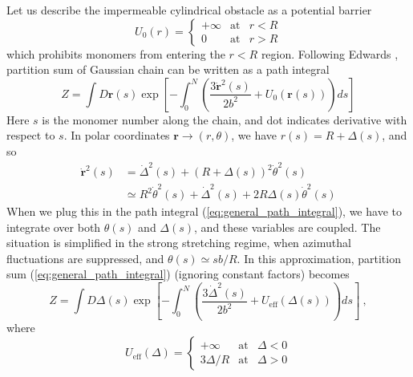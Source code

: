 \documentclass[aps,pre,floatfix,twocolumn,nofootinbib]{revtex4-2}
\begin{document}
Let us describe the impermeable cylindrical obstacle as a potential barrier
%
\begin{equation} U_0(r) = \left\{ \begin{array}{lcr} + \infty & \text{at} & r<R \\ 0 & \text{at} & r > R \end{array} \right. \end{equation}
%
which prohibits monomers from entering the $r<R$ region.  Following Edwards \cite{DoiEdwards}, partition sum of Gaussian chain can be written as a path integral
%
\begin{equation} Z = \int D \mathbf{r}(s) \exp \left[- \int_{0}^{N} \left( \frac{3 \dot{\mathbf{r}}^2(s)}{2 b^2} + U_0(\mathbf{r}(s)) \right) ds \right] \label{eq:general_path_integral} \end{equation}
%
Here $s$ is the monomer number along the chain, and dot indicates derivative with respect to $s$.   In polar coordinates $\mathbf{r} \to (r,\theta)$, we have $r(s) = R + \Delta(s)$, and so
%
\begin{equation}\begin{split}  \dot{\mathbf{r}}^2(s) & = \dot{\Delta}^2(s) + (R+ \Delta(s))^2 \dot{\theta}^2(s) \\ & \simeq R^2 \dot{\theta}^2(s) + \dot{\Delta}^2(s) + 2 R \Delta(s) \dot{\theta}^2(s) \end{split}
\label{eq:kin_energy_polar_coord} \end{equation}
%
When we plug this in the path integral (\ref{eq:general_path_integral}), we have to integrate over both $\theta(s)$ and $\Delta(s)$, and these variables are coupled.  The situation is simplified in the strong stretching regime, when azimuthal fluctuations are suppressed, and $\theta(s) \simeq sb/R$.  In this approximation, partition sum (\ref{eq:general_path_integral}) (ignoring constant factors) becomes
%
\begin{equation}  Z  =  \int D \Delta(s) \exp \left[- \int_{0}^{N} \left( \frac{3 \dot{\Delta}^2(s)}{2 b^2} + U_{\mathrm{eff}}(\Delta(s)) \right) ds \right] \ , \label{eq:effective_path_integral}  \end{equation}
%
where
%
\begin{equation} U_{\mathrm{eff}} (\Delta) = \left\{ \begin{array}{lcr} + \infty & \text{at} & \Delta < 0  \\ 3 \Delta / R   & \text{at} & \Delta > 0 \end{array} \right. \label{eq:triangular_potential} \end{equation}
\end{document}
